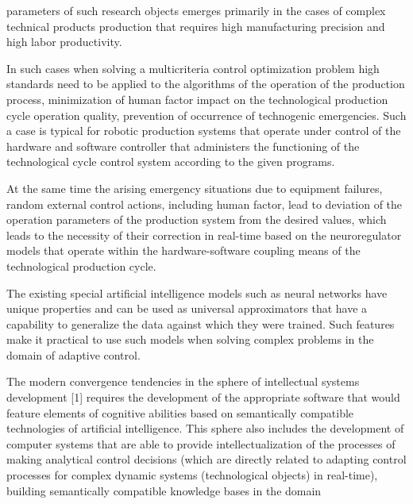 \documentclass{article}
\begin{document}
\begin{multicols}{2}
parameters of such research objects emerges primarily
in the cases of complex technical products production
that requires high manufacturing precision and high labor
productivity. \par
In such cases when solving a multicriteria control
optimization problem high standards need to be applied to
the algorithms of the operation of the production process,
minimization of human factor impact on the technological
production cycle operation quality, prevention of occurrence of technogenic emergencies. Such a case is typical
for robotic production systems that operate under control
of the hardware and software controller that administers
the functioning of the technological cycle control system
according to the given programs. \par
At the same time the arising emergency situations due
to equipment failures, random external control actions,
including human factor, lead to deviation of the operation
parameters of the production system from the desired
values, which leads to the necessity of their correction
in real-time based on the neuroregulator models that
operate within the hardware-software coupling means of
the technological production cycle. \par
The existing special artificial intelligence models such
as neural networks have unique properties and can be
used as universal approximators that have a capability
to generalize the data against which they were trained.
Such features make it practical to use such models when
solving complex problems in the domain of adaptive
control. \par
The modern convergence tendencies in the sphere of
intellectual systems development [1] requires the development of the appropriate software that would feature
elements of cognitive abilities based on semantically
compatible technologies of artificial intelligence. This
sphere also includes the development of computer systems
that are able to provide intellectualization of the processes
of making analytical control decisions (which are directly
related to adapting control processes for complex dynamic
systems (technological objects) in real-time), building
semantically compatible knowledge bases in the domain
\end{multicols}
\newpage
\end{document}
